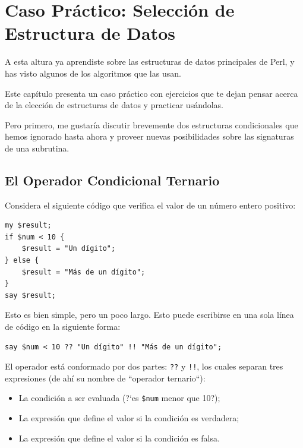 
\chapter{Caso Práctico: Selección de Estructura de Datos}
\label{data_struct_sel}

A esta altura ya aprendiste sobre las estructuras de datos principales
de Perl, y has visto algunos de los algoritmos que las usan.

Este capítulo presenta un caso práctico con ejercicios que te dejan 
pensar acerca de la elección de estructuras de datos y practicar 
usándolas.

Pero primero, me gustaría discutir brevemente dos estructuras condicionales
que hemos ignorado hasta ahora y proveer nuevas posibilidades sobre las
signaturas de una subrutina.

\section{El Operador Condicional Ternario}
\label{ternary operator}

Considera el siguiente código que verifica el valor de un
número entero positivo:

\begin{verbatim}
my $result;
if $num < 10 {
    $result = "Un dígito";
} else {
    $result = "Más de un dígito";
}
say $result;
\end{verbatim}

Esto es bien simple, pero un poco largo. Esto puede escribirse
en una sola línea de código en la siguiente forma:

\begin{verbatim}
say $num < 10 ?? "Un dígito" !! "Más de un dígito";
\end{verbatim}

El operador está conformado por dos partes: {\tt ??} y {\tt !!},
los cuales separan tres expresiones (de ahí su nombre de ``operador ternario``):
\begin{itemize}
\item La condición a ser evaluada (?`es \verb|$num| menor que 10?);
\item La expresión que define el valor si la condición es verdadera;
\item La expresión que define el valor si la condición es falsa.
\end{itemize}


